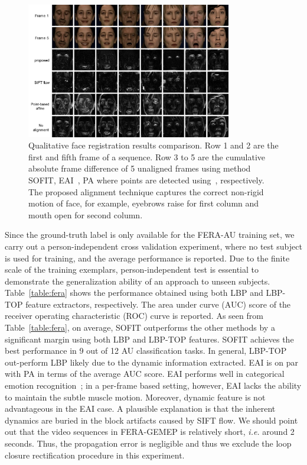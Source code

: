 \documentclass[10pt,journal]{IEEEtran}
\begin{document}
\begin{figure}[t]
	\centering
		\includegraphics[width=0.8\textwidth]{fig/fera_diff.png}
	\caption{Qualitative face registration results comparison. Row 1 and 2 are the first and fifth frame of a sequence. Row 3 to 5 are the cumulative absolute frame difference of 5 unaligned frames using method SOFIT, EAI~\cite{Yang_SMCB12}, PA where points are detected using~\cite{Tadas_ECCV14}, respectively. The proposed alignment technique captures the correct non-rigid motion of face, for example, eyebrows raise for first column and mouth open for second column.}
	\label{fig:fera_diff}
\end{figure}


Since the ground-truth label is only available for the FERA-AU training set, we carry out a person-independent cross validation experiment, where no test subject is used for training, and the average performance is reported. Due to the finite scale of the training exemplars, person-independent test is essential to demonstrate the generalization ability of an approach to unseen subjects. Table~\ref{table:fera} shows the performance obtained using both LBP and LBP-TOP feature extractors, respectively. The area under curve (AUC) score of the receiver operating characteristic (ROC) curve is reported. As seen from Table~\ref{table:fera}, on average, SOFIT outperforms the other methods by a significant margin using both LBP and LBP-TOP features. SOFIT achieves the best performance in 9 out of 12 AU classification tasks. In general, LBP-TOP out-perform LBP likely due to the dynamic information extracted. EAI is on par with PA in terms of the average AUC score. EAI performs well in categorical emotion recognition~\cite{Yang_SMCB12}; in a per-frame based setting, however, EAI lacks the ability to maintain the subtle muscle motion. Moreover, dynamic feature is not advantageous in the EAI case. A plausible explanation is that the inherent dynamics are buried in the block artifacts caused by SIFT flow. We should point out that the video sequences in FERA-GEMEP is relatively short, \textit{i.e.} around 2 seconds. Thus, the propagation error is negligible and thus we exclude the loop closure rectification procedure in this experiment. 
\end{document}
